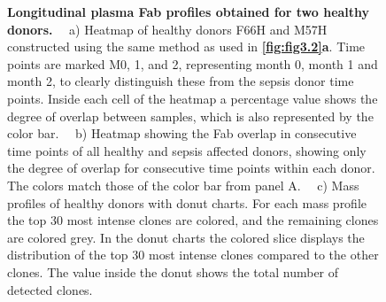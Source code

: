 \begin{subappendices}
\begin{figure}[!p]
  \end{figure}
  \addtocounter{figure}{-1}
  \begin{figure}[pht!]
    \caption{
      \textbf{Longitudinal plasma Fab profiles obtained for two healthy donors.} ~~a) Heatmap of healthy donors F66H and M57H constructed using the same method as used in \textbf{\autoref{fig:fig3.2}a}. Time points are marked M0, 1, and 2, representing month 0, month 1 and month 2, to clearly distinguish these from the sepsis donor time points. Inside each cell of the heatmap a percentage value shows the degree of overlap between samples, which is also represented by the color bar. ~~b) Heatmap showing the Fab overlap in consecutive time points of all healthy and sepsis affected donors, showing only the degree of overlap for consecutive time points within each donor. The colors match those of the color bar from panel A. ~~c) Mass profiles of healthy donors with donut charts. For each mass profile the top 30 most intense clones are colored, and the remaining clones are colored grey. In the donut charts the colored slice displays the distribution of the top 30 most intense clones compared to the other clones. The value inside the donut shows the total number of detected clones.
    }
  \end{figure}


\end{subappendices}
